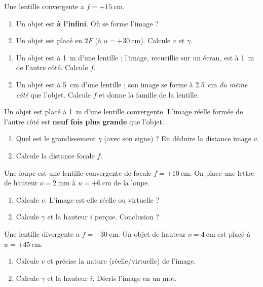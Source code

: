 \documentclass[11pt,a4paper]{article}
\begin{document}

\begin{exo}
Une lentille convergente a $f=+\qty{15}{\cm}$.
\begin{enumerate}[label=\alph*)]
  \item Un objet est \textbf{à l'infini}. Où se forme l'image ?
  \item Un objet est placé en $2F$ (à $u=+\qty{30}{\cm}$). Calcule $v$ et $\gamma$.
\end{enumerate}
\end{exo}

\begin{exo}
\begin{enumerate}[label=\alph*)]
  \item Un objet est à \qty{1}{\m} d'une lentille ; l'image, recueillie sur un écran, est à \qty{1}{\m}
        de l'autre côté. Calcule $f$.
  \item Un objet est à \qty{5}{\cm} d'une lentille ; son image se forme à \qty{2.5}{\cm} \emph{du même
        côté} que l'objet. Calcule $f$ et donne la famille de la lentille.
\end{enumerate}
\end{exo}

\begin{exo}
Un objet est placé à \qty{1}{\m} d'une lentille convergente. L'image réelle formée de l'autre côté est
\textbf{neuf fois plus grande} que l'objet.
\begin{enumerate}[label=\alph*)]
  \item Quel est le grandissement $\gamma$ (avec son signe) ? En déduire la distance image $v$.
  \item Calcule la distance focale $f$.
\end{enumerate}
\end{exo}

\begin{exo}
Une loupe est une lentille convergente de focale $f=+\qty{10}{\cm}$. On place une lettre de hauteur
$o=\qty{2}{\mm}$ à $u=+\qty{6}{\cm}$ de la loupe.
\begin{enumerate}[label=\alph*)]
  \item Calcule $v$. L'image est-elle réelle ou virtuelle ?
  \item Calcule $\gamma$ et la hauteur $i$ perçue. Conclusion ?
\end{enumerate}
\end{exo}

\begin{exo}
Une lentille divergente a $f=-\qty{30}{\cm}$. Un objet de hauteur $o=\qty{4}{\cm}$ est placé à
$u=+\qty{45}{\cm}$.
\begin{enumerate}[label=\alph*)]
  \item Calcule $v$ et précise la nature (réelle/virtuelle) de l'image.
  \item Calcule $\gamma$ et la hauteur $i$. Décris l'image en un mot.
\end{enumerate}
\end{exo}
\end{document}
